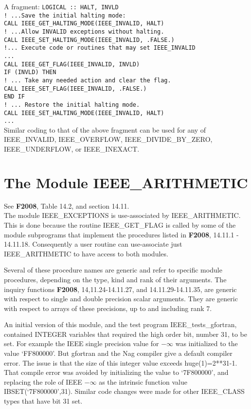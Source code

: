 \documentclass[12pt]{article}
\begin{document}
 A fragment:
{\tt     LOGICAL :: HALT, INVLD\\
 ! ...Save the initial halting mode:\\
       CALL IEEE\_GET\_HALTING\_MODE(IEEE\_INVALID, HALT)\\
! ...Allow INVALID exceptions without halting.\\       
       CALL IEEE\_SET\_HALTING\_MODE(IEEE\_INVALID, .FALSE.)\\
 !... Execute  code  or routines that may set IEEE\_INVALID\\
 ...\\
        CALL IEEE\_GET\_FLAG(IEEE\_INVALID, INVLD)\\
      IF (INVLD) THEN\\
! ... Take any needed action and clear the flag.\\    
       CALL IEEE\_SET\_FLAG(IEEE\_INVALID, .FALSE.)\\ 
       END IF\\   
! ... Restore the initial halting mode.\\ 
      CALL IEEE\_SET\_HALTING\_MODE(IEEE\_INVALID, HALT)\\ 
  ...\\     
 }
 Similar coding to that of the above fragment  can be used for any of
  IEEE\_INVALID, IEEE\_OVERFLOW, IEEE\_DIVIDE\_BY\_ZERO,
IEEE\_UNDERFLOW, or IEEE\_INEXACT.   

\section{The Module IEEE\_ARITHMETIC}
See  {\bf F2008}, Table 14.2, and section 14.11. \\ 
The module IEEE\_EXCEPTIONS is  use-associated by IEEE\_ARITHMETIC.   This is done because
the routine IEEE\_GET\_FLAG is called by some of the module subprograms that implement the
procedures listed in {\bf F2008}, 14.11.1 - 14.11.18.  Consequently a user routine can  use-associate
just  IEEE\_ARITHMETIC to have access to both modules.

Several of these procedure names are generic and refer to specific module procedures, depending on the type, kind and rank of their  arguments.  The inquiry functions {\bf F2008}, 14,11.24-14.11.27, and 14.11.29-14.11.35,  are generic with respect to single and double precision scalar arguments.  They are  generic with respect to arrays of these precisions, up to and including  rank 7.

An initial version of this module, and the test program  IEEE\_tests\_gfortran, contained INTEGER variables that required
the high order bit, number 31, to be set.  For example the IEEE single precision value for $-\infty$ was initialized to the value \lq{}FF800000\rq{}.  But gfortran and the Nag compiler give a default compiler error.  The issue is that the size of this integer value exceeds  huge(1)=2**31-1.  That compile error was avoided by initializing the  value to \lq{}7F800000\rq{}, and replacing the role of  IEEE $-\infty$  as the intrinsic function value IBSET(\lq{}7F800000\rq{},31).  Similar code changes were made for other IEEE\_CLASS types that  have bit 31 set. 
\end{document}
